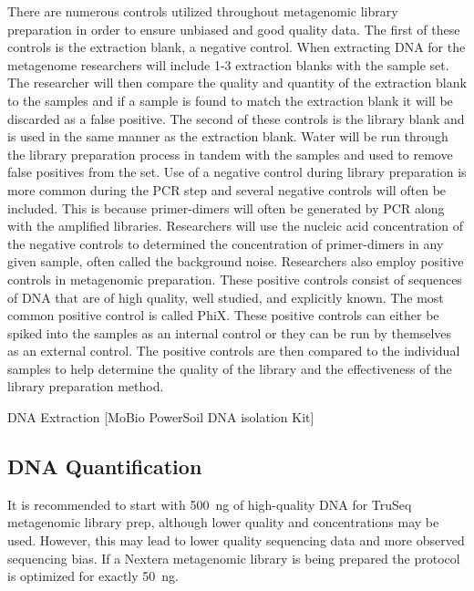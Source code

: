 \documentclass[graybox]{svmult}
\begin{document}
There are numerous controls utilized throughout metagenomic library preparation in order to ensure unbiased and good quality data. The first of these controls is the extraction blank, a negative control. When extracting DNA for the metagenome researchers will include 1-3 extraction blanks with the sample set. The researcher will then compare the quality and quantity of the extraction blank to the samples and if a sample is found to match the extraction blank it will be discarded as a false positive.
%
The second of these controls is the library blank and is used in the same manner as the extraction blank. Water will be run through the library preparation process in tandem with the samples and used to remove false positives from the set.
%
Use of a negative control during library preparation is more common during the PCR step and several negative controls will often be included. This is because primer-dimers will often be generated by PCR along with the amplified libraries. Researchers will use the nucleic acid concentration of the negative controls to determined the concentration of primer-dimers in any given sample, often called the background noise.
%
Researchers also employ positive controls in metagenomic preparation. These positive controls consist of sequences of DNA that are of high quality, well studied, and explicitly known. The most common positive control is called PhiX. These positive controls can either be spiked into the samples as an internal control or they can be run by themselves as an external control. The positive controls are then compared to the individual samples to help determine the quality of the library and the effectiveness of the library preparation method.

DNA Extraction
[MoBio PowerSoil DNA isolation Kit]

\subsection{DNA Quantification}

It is recommended to start with 500~ng of high-quality DNA for TruSeq metagenomic library prep, although lower quality and concentrations may be used. However, this may lead to lower quality sequencing data and more observed sequencing bias. If a Nextera metagenomic library is being prepared the protocol is optimized for exactly 50~ng.
\end{document}
